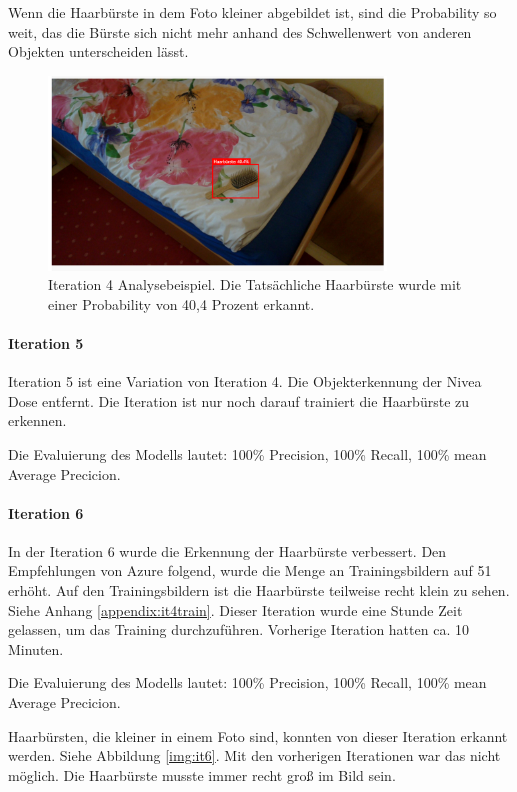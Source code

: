 Wenn die Haarbürste in dem Foto kleiner abgebildet ist, sind die Probability so weit, das die Bürste sich nicht mehr anhand des Schwellenwert von anderen Objekten unterscheiden lässt.

\begin{figure}[H]
	\centering
	\includegraphics[width=0.8\textwidth]{images/it4notpretty2.png}
	\caption[Iteration 4 zweites Analysebeispiel]{Iteration 4 Analysebeispiel. Die Tatsächliche Haarbürste wurde mit einer Probability von 40,4 Prozent erkannt.}
	\label{img:it4}
\end{figure}
\paragraph{Iteration 5}

Iteration 5 ist eine Variation von Iteration 4. Die Objekterkennung der Nivea Dose entfernt. Die Iteration ist nur noch darauf trainiert die Haarbürste zu erkennen. 

Die Evaluierung des Modells lautet: 100\% Precision, 100\% Recall, 100\% mean Average Precicion.

\paragraph{Iteration 6}

In der Iteration 6 wurde die Erkennung der Haarbürste verbessert. Den Empfehlungen von Azure folgend, wurde die Menge an Trainingsbildern auf 51 erhöht. Auf den Trainingsbildern ist die Haarbürste teilweise recht klein zu sehen. Siehe Anhang \ref{appendix:it4train}. Dieser Iteration wurde eine Stunde Zeit gelassen, um das Training durchzuführen. Vorherige Iteration hatten ca. 10 Minuten.

Die Evaluierung des Modells lautet: 100\% Precision, 100\% Recall, 100\% mean Average Precicion.

Haarbürsten, die kleiner in einem Foto sind, konnten von dieser Iteration erkannt werden. Siehe Abbildung \ref{img:it6}. Mit den vorherigen Iterationen war das nicht möglich. Die Haarbürste musste immer recht groß im Bild sein. 

